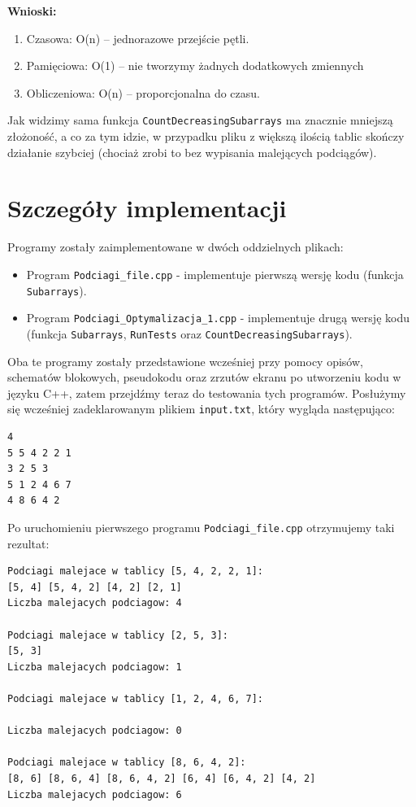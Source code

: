 \documentclass[a4paper,12pt]{article}
\begin{document}
\textbf{Wnioski:}
\begin{enumerate}
\item{Czasowa: O(n) – jednorazowe przejście pętli.}
\item{Pamięciowa: O(1) – nie tworzymy żadnych dodatkowych zmiennych}
\item{Obliczeniowa: O(n) – proporcjonalna do czasu.}
\end{enumerate}

\rule{0cm}{0.5cm} %

Jak widzimy sama funkcja \texttt{CountDecreasingSubarrays} ma znacznie mniejszą złożoność, a co za tym idzie, w przypadku pliku z większą ilością tablic skończy działanie szybciej (chociaż zrobi to bez wypisania malejących podciągów).

\newpage

\section{Szczegóły implementacji}
Programy zostały zaimplementowane w dwóch oddzielnych plikach:
\begin{itemize}
    \item Program \texttt{Podciagi\_file.cpp} - implementuje pierwszą wersję kodu (funkcja \texttt{Subarrays}).
    \item Program \texttt{Podciagi\_Optymalizacja\_1.cpp} - implementuje drugą wersję kodu (funkcja \texttt{Subarrays}, \texttt{RunTests} oraz \texttt{CountDecreasingSubarrays}).
\end{itemize}

\rule{0cm}{0.1cm} %

Oba te programy zostały przedstawione wcześniej przy pomocy opisów, schematów blokowych, pseudokodu oraz zrzutów ekranu po utworzeniu kodu w języku C++, zatem przejdźmy teraz do testowania tych programów. Posłużymy się wcześniej zadeklarowanym plikiem \texttt{input.txt}, który wygląda następująco:

\begin{verbatim}
4
5 5 4 2 2 1
3 2 5 3
5 1 2 4 6 7
4 8 6 4 2
\end{verbatim}

Po uruchomieniu pierwszego programu \texttt{Podciagi\_file.cpp} otrzymujemy taki rezultat:

\begin{verbatim}
Podciagi malejace w tablicy [5, 4, 2, 2, 1]:
[5, 4] [5, 4, 2] [4, 2] [2, 1] 
Liczba malejacych podciagow: 4

Podciagi malejace w tablicy [2, 5, 3]:
[5, 3] 
Liczba malejacych podciagow: 1

Podciagi malejace w tablicy [1, 2, 4, 6, 7]:

Liczba malejacych podciagow: 0

Podciagi malejace w tablicy [8, 6, 4, 2]:
[8, 6] [8, 6, 4] [8, 6, 4, 2] [6, 4] [6, 4, 2] [4, 2] 
Liczba malejacych podciagow: 6
\end{verbatim}
\end{document}
